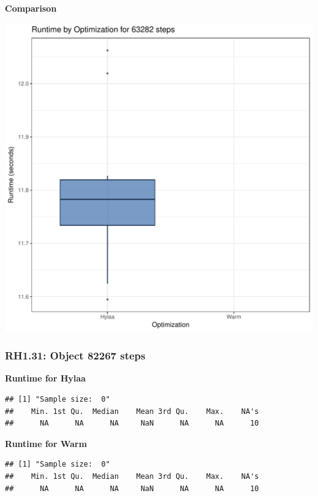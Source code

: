 \documentclass{article}\usepackage[]{graphicx}\usepackage[]{color}
\makeatletter
\def\maxwidth{ %
  \ifdim\Gin@nat@width>\linewidth
    \linewidth
  \else
    \Gin@nat@width
  \fi
}
\newenvironment{kframe}{%
 \def\at@end@of@kframe{}%
 \ifinner\ifhmode%
  \def\at@end@of@kframe{\end{minipage}}%
  \begin{minipage}{\columnwidth}%
 \fi\fi%
 \def\FrameCommand##1{\hskip\@totalleftmargin \hskip-\fboxsep
 \colorbox{shadecolor}{##1}\hskip-\fboxsep
     \hskip-\linewidth \hskip-\@totalleftmargin \hskip\columnwidth}%
 \MakeFramed {\advance\hsize-\width
   \@totalleftmargin\z@ \linewidth\hsize
   \@setminipage}}%
 {\par\unskip\endMakeFramed%
 \at@end@of@kframe}
\newenvironment{knitrout}{}{} %
\makeatother
\begin{document}
 \textbf{Comparison}
  
\begin{knitrout}
\color{fgcolor}
\includegraphics[width=\maxwidth]{figure/RH1_steps63282-1} 

\end{knitrout}


\subsubsection{RH1.31: Object 82267 steps}

 \textbf{Runtime for Hylaa}
\begin{knitrout}
\color{fgcolor}\begin{kframe}
\begin{verbatim}
## [1] "Sample size:  0"
##    Min. 1st Qu.  Median    Mean 3rd Qu.    Max.    NA's 
##      NA      NA      NA     NaN      NA      NA      10
\end{verbatim}
\end{kframe}
\end{knitrout}
 \textbf{Runtime for Warm}
\begin{knitrout}
\color{fgcolor}\begin{kframe}
\begin{verbatim}
## [1] "Sample size:  0"
##    Min. 1st Qu.  Median    Mean 3rd Qu.    Max.    NA's 
##      NA      NA      NA     NaN      NA      NA      10
\end{verbatim}
\end{kframe}
\end{knitrout}
  
\end{document}
